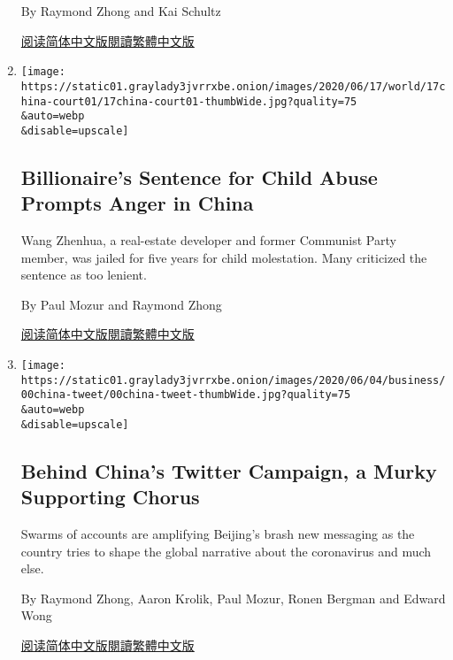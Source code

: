 \begin{enumerate}
  By Raymond Zhong and Kai Schultz

  \href{https://cn.nytimes3xbfgragh.onion/technology/20200701/india-china-tiktok/}{阅读简体中文版}\href{https://cn.nytimes3xbfgragh.onion/technology/20200701/india-china-tiktok/zh-hant/}{閱讀繁體中文版}
\item
  \href{/2020/06/17/world/asia/china-wang-zhenhua-sentence.html}{}

  \texttt{[image: https://static01.graylady3jvrrxbe.onion/images/2020/06/17/world/17china-court01/17china-court01-thumbWide.jpg?quality=75\\\&auto=webp\\\&disable=upscale]}

  \hypertarget{billionaires-sentence-for-child-abuse-prompts-anger-in-china}{%
  \subsection{Billionaire's Sentence for Child Abuse Prompts Anger in
  China}\label{billionaires-sentence-for-child-abuse-prompts-anger-in-china}}

  Wang Zhenhua, a real-estate developer and former Communist Party
  member, was jailed for five years for child molestation. Many
  criticized the sentence as too lenient.

  By Paul Mozur and Raymond Zhong

  \href{https://cn.nytimes3xbfgragh.onion/china/20200618/china-wang-zhenhua-sentence/}{阅读简体中文版}\href{https://cn.nytimes3xbfgragh.onion/china/20200618/china-wang-zhenhua-sentence/z}{閱讀繁體中文版}
\item
  \href{/2020/06/08/technology/china-twitter-disinformation.html}{}

  \texttt{[image: https://static01.graylady3jvrrxbe.onion/images/2020/06/04/business/00china-tweet/00china-tweet-thumbWide.jpg?quality=75\\\&auto=webp\\\&disable=upscale]}

  \hypertarget{behind-chinas-twitter-campaign-a-murky-supporting-chorus}{%
  \subsection{Behind China's Twitter Campaign, a Murky Supporting
  Chorus}\label{behind-chinas-twitter-campaign-a-murky-supporting-chorus}}

  Swarms of accounts are amplifying Beijing's brash new messaging as the
  country tries to shape the global narrative about the coronavirus and
  much else.

  By Raymond Zhong, Aaron Krolik, Paul Mozur, Ronen Bergman and Edward
  Wong

  \href{https://cn.nytimes3xbfgragh.onion/technology/20200609/china-twitter-disinformation/}{阅读简体中文版}\href{https://cn.nytimes3xbfgragh.onion/technology/20200609/china-twitter-disinformation/zh}{閱讀繁體中文版}
\end{enumerate}


